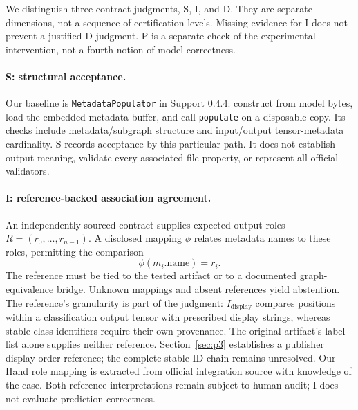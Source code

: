 \documentclass[10pt,twocolumn,letterpaper]{article}
\newcommand{\code}[1]{\texttt{#1}}
\begin{document}
We distinguish three contract judgments, S, I, and D. They are separate dimensions, not a sequence of certification levels. Missing evidence for I does not prevent a justified D judgment. P is a separate check of the experimental intervention, not a fourth notion of model correctness.

\paragraph{S: structural acceptance.}
Our baseline is \code{MetadataPopulator} in Support 0.4.4: construct from model bytes, load the embedded metadata buffer, and call \code{populate} on a disposable copy. Its checks include metadata/subgraph structure and input/output tensor-metadata cardinality. S records acceptance by this particular path. It does not establish output meaning, validate every associated-file property, or represent all official validators.

\paragraph{I: reference-backed association agreement.}
An independently sourced contract supplies expected output roles $R=(r_0,\ldots,r_{n-1})$. A disclosed mapping $\phi$ relates metadata names to these roles, permitting the comparison
\begin{equation}
\phi(m_i.\mathrm{name})=r_i.
\end{equation}
The reference must be tied to the tested artifact or to a documented graph-equivalence bridge. Unknown mappings and absent references yield abstention. The reference's granularity is part of the judgment: $I_{\mathrm{display}}$ compares positions within a classification output tensor with prescribed display strings, whereas stable class identifiers require their own provenance. The original artifact's label list alone supplies neither reference. Section~\ref{sec:p3} establishes a publisher display-order reference; the complete stable-ID chain remains unresolved. Our Hand role mapping is extracted from official integration source with knowledge of the case. Both reference interpretations remain subject to human audit; I does not evaluate prediction correctness.
\end{document}
